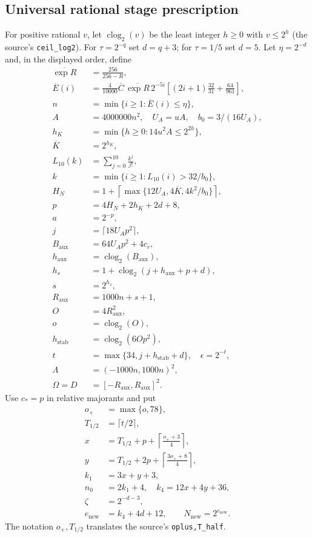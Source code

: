 \subsection{Universal rational stage prescription}
For positive rational $v$, let $\operatorname{clog}_2(v)$ be the least
integer $h\ge0$ with $v\le2^h$ (the source's \texttt{ceil\_log2}).
For $\tau=2^{-q}$ set $d=q+3$; for $\tau=1/5$ set $d=5$.
Let $\eta=2^{-d}$ and, in the displayed order, define
\begin{align*}
 \overline{\exp R}&=\frac{256}{256-R},\\
 \overline E(i)&=\frac4{10000}\overline C\,\overline{\exp R}\,2^{-5i}
              \left[(2i+1)\frac{32}{31}+\frac{64}{961}\right],\\
 n&=\min\{i\ge1:\overline E(i)\le\eta\},\\
 A&=4000000n^2,\quad U_A=uA,\quad b_0=3/(16U_A),\\
 h_K&=\min\{h\ge0:14u^2 A\le2^{2h}\},\\
 \overline K&=2^{h_K},\\
 L_{10}(k)&=\sum_{j=0}^{10}\frac{k^j}{j!},\\
 k&=\min\{i\ge1:L_{10}(i)>32/b_0\},\\
 H_N&=1+\left\lceil\max\{12U_A,4\overline K,4k^2/b_0\}\right\rceil,\\
 p&=4H_N+2h_K+2d+8,\\
 a&=2^{-p},\\
 j&=\lceil18U_Ap^2\rceil,\\
 B_{\mathrm{aux}}&=64U_Ap^2+4c_r,\\
 h_{\mathrm{aux}}&=\operatorname{clog}_2(B_{\mathrm{aux}}),\\
 h_s&=1+\operatorname{clog}_2(j+h_{\mathrm{aux}}+p+d),\\
 s&=2^{h_s},\\
 R_{\mathrm{aux}}&=1000n+s+1,\\
 O&=4R_{\mathrm{aux}}^2,\\
 o&=\operatorname{clog}_2(O),\\
 h_{\mathrm{stab}}&=\operatorname{clog}_2(6Op^2),\\
 t&=\max\{34,j+h_{\mathrm{stab}}+d\},\quad\epsilon=2^{-t},\\
 \Lambda&=(-1000n,1000n)^2,\\
 \Omega=D&=[-R_{\mathrm{aux}},R_{\mathrm{aux}}]^2.
\end{align*}
Use $c_*=p$ in relative majorants and put
\begin{align*}
 o_+&=\max\{o,78\},\\
 T_{1/2}&=\lceil t/2\rceil,\\
 x&=T_{1/2}+p+\left\lceil\frac{o_++3}{4}\right\rceil,\\
 y&=T_{1/2}+2p+\left\lceil\frac{3o_++8}{4}\right\rceil,\\
 k_1&=3x+y+3,\\
 n_0&=2k_1+4,\quad k_4=12x+4y+36,\\
 \zeta&=2^{-d-3},\\
 e_{\mathrm{new}}&=k_4+4d+12,
 \qquad N_{\mathrm{new}}=2^{e_{\mathrm{new}}}.
\end{align*}
The notation $o_+,T_{1/2}$ translates the source's \texttt{oplus,T\_half}.

